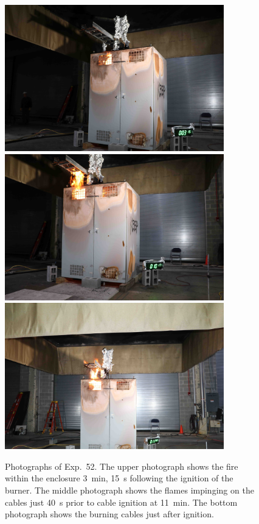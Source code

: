 \begin{figure}[p]
\centering
\includegraphics[height=2.50in]{../FIGURES/Test_52_3_min_15_s} \\ \vspace{0.1in}
\includegraphics[height=2.50in]{../FIGURES/Test_52_10_min_17_s} \\ \vspace{0.1in}
\includegraphics[height=2.50in]{../FIGURES/Test_52_11_min_50_s}
\caption[Photographs of Exp.~52]{Photographs of Exp.~52. The upper photograph shows the fire within the enclosure 3~min, 15~s following the ignition of the burner. The middle photograph shows the flames impinging on the cables just 40~s prior to cable ignition at 11~min. The bottom photograph shows the burning cables just after ignition.}
\label{fig:Test_52_photos}
\end{figure}


